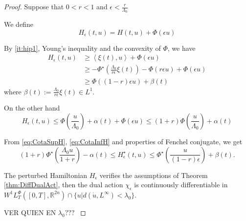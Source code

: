 \documentclass[twoside]{article}
\theoremstyle{remark}
\newcommand{\lphi}{L^{\Phi}}
\newcommand{\wphit}{W^{1}\lphi_T}
\newcommand{\rr}{\mathbb{R}}
\renewcommand{\leq}{\leqslant}
\renewcommand{\geq}{\geqslant}
\begin{document}
\begin{proof} 

Suppose that $0<r<1$ and $\epsilon<\frac{r}{\Lambda_0}$

We define
\[
  H_{\epsilon}(t,u)=H(t,u)+\Phi(\epsilon u)
\]
 

By \ref{it:hip1}, Young's inequality and the convexity of $\Phi$, we have
\begin{equation}\label{eq:CotaSupH}
 \begin{split}
    H_{\epsilon}(t,u)  &\geq \left\langle \xi(t), u \right\rangle +\Phi(\epsilon u)
		\\
				&\geq -\Phi^{\star}\left(\frac{\Lambda_0}{r\epsilon} \xi(t)\right)-\Phi(r\epsilon u)+\Phi(\epsilon u)
		\\
		    &\geq  \Phi((1-r)\epsilon u)+\beta(t)
				  \end{split} 
\end{equation}
where $\beta(t):= \frac{\Lambda_0}{r\epsilon} \xi(t)\in L^1$. 

On the other hand
\begin{equation}\label{eq:CotaInfH}
  H_{\epsilon}(t,u)  \leq  \Phi\left(\frac{u}{\Lambda_0}\right)+\alpha(t)+\Phi(\epsilon u)\leq 
	(1+r)\Phi\left(\frac{u}{\Lambda_0}\right)+\alpha(t)
\end{equation}


From  \eqref{eq:CotaSupH}, \eqref{eq:CotaInfH} and  properties of Fenchel conjugate, we get
\begin{equation}\label{eq:CotaH*}
(1+r)\Phi^{\star}\left(\frac{\Lambda_0 u}{1+r}\right)-\alpha(t)\leq H^{\star}_{\epsilon}(t,u)\leq \Phi^{\star}\left(\frac{u}{(1-r)\epsilon}\right)+\beta(t).
\end{equation}

The perturbed Hamiltonian $H_{\epsilon}$ verifies the assumptions of Theorem \ref{thm:DiffDualAct}, 
then the dual action $\chi_{\epsilon}$
is continuously differentiable in $\wphit([0,T],\rr^{2n}) \cap \{u|d(\dot{u},L^{\infty})<\lambda_0\}$.

\textcolor[rgb]{1,0,0}{VER QUIEN EN $\lambda_0???$
}


\end{proof}
\end{document}
